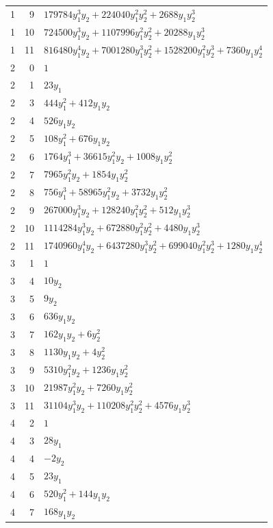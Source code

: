 \documentclass[10pt,a4paper]{article}
\begin{document}
{\begin{longtable}{rrp{125mm}}
1 & 9 & $179784 y_{1}^{3} y_{2} + 224040 y_{1}^{2} y_{2}^{2} + 2688 y_{1} y_{2}^{3}$\\
1 & 10 & $724500 y_{1}^{3} y_{2} + 1107996 y_{1}^{2} y_{2}^{2} + 20288 y_{1} y_{2}^{3}$\\
1 & 11 & $816480 y_{1}^{4} y_{2} + 7001280 y_{1}^{3} y_{2}^{2} + 1528200 y_{1}^{2} y_{2}^{3} + 7360 y_{1} y_{2}^{4}$\\
2 & 0 & $1$\\
2 & 1 & $23 y_{1}$\\
2 & 3 & $444 y_{1}^{2} + 412 y_{1} y_{2}$\\
2 & 4 & $526 y_{1} y_{2}$\\
2 & 5 & $108 y_{1}^{2} + 676 y_{1} y_{2}$\\
2 & 6 & $1764 y_{1}^{3} + 36615 y_{1}^{2} y_{2} + 1008 y_{1} y_{2}^{2}$\\
2 & 7 & $7965 y_{1}^{2} y_{2} + 1854 y_{1} y_{2}^{2}$\\
2 & 8 & $756 y_{1}^{3} + 58965 y_{1}^{2} y_{2} + 3732 y_{1} y_{2}^{2}$\\
2 & 9 & $267000 y_{1}^{3} y_{2} + 128240 y_{1}^{2} y_{2}^{2} + 512 y_{1} y_{2}^{3}$\\
2 & 10 & $1114284 y_{1}^{3} y_{2} + 672880 y_{1}^{2} y_{2}^{2} + 4480 y_{1} y_{2}^{3}$\\
2 & 11 & $1740960 y_{1}^{4} y_{2} + 6437280 y_{1}^{3} y_{2}^{2} + 699040 y_{1}^{2} y_{2}^{3} + 1280 y_{1} y_{2}^{4}$\\
3 & 1 & $1$\\
3 & 4 & $10 y_{2}$\\
3 & 5 & $9 y_{2}$\\
3 & 6 & $636 y_{1} y_{2}$\\
3 & 7 & $162 y_{1} y_{2} + 6 y_{2}^{2}$\\
3 & 8 & $1130 y_{1} y_{2} + 4 y_{2}^{2}$\\
3 & 9 & $5310 y_{1}^{2} y_{2} + 1236 y_{1} y_{2}^{2}$\\
3 & 10 & $21987 y_{1}^{2} y_{2} + 7260 y_{1} y_{2}^{2}$\\
3 & 11 & $31104 y_{1}^{3} y_{2} + 110208 y_{1}^{2} y_{2}^{2} + 4576 y_{1} y_{2}^{3}$\\
4 & 2 & $1$\\
4 & 3 & $28 y_{1}$\\
4 & 4 & $- 2 y_{2}$\\
4 & 5 & $23 y_{1}$\\
4 & 6 & $520 y_{1}^{2} + 144 y_{1} y_{2}$\\
4 & 7 & $168 y_{1} y_{2}$\\

\end{longtable}}
\end{document}
